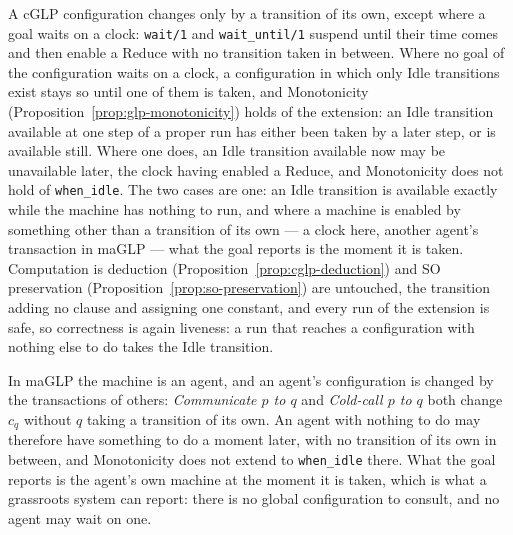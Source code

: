 A cGLP configuration changes only by a transition of its own, except where a goal waits on a clock: \verb|wait/1| and \verb|wait_until/1| suspend until their time comes and then enable a Reduce with no transition taken in between.  Where no goal of the configuration waits on a clock, a configuration in which only Idle transitions exist stays so until one of them is taken, and Monotonicity (Proposition~\ref{prop:glp-monotonicity}) holds of the extension: an Idle transition available at one step of a proper run has either been taken by a later step, or is available still.  Where one does, an Idle transition available now may be unavailable later, the clock having enabled a Reduce, and Monotonicity does not hold of \verb|when_idle|.  The two cases are one: an Idle transition is available exactly while the machine has nothing to run, and where a machine is enabled by something other than a transition of its own --- a clock here, another agent's transaction in maGLP --- what the goal reports is the moment it is taken.  Computation is deduction (Proposition~\ref{prop:cglp-deduction}) and SO preservation (Proposition~\ref{prop:so-preservation}) are untouched, the transition adding no clause and assigning one constant, and every run of the extension is safe, so correctness is again liveness: a run that reaches a configuration with nothing else to do takes the Idle transition.

In maGLP the machine is an agent, and an agent's configuration is changed by the transactions of others: \emph{Communicate $p$ to $q$} and \emph{Cold-call $p$ to $q$} both change $c_q$ without $q$ taking a transition of its own.  An agent with nothing to do may therefore have something to do a moment later, with no transition of its own in between, and Monotonicity does not extend to \verb|when_idle| there.  What the goal reports is the agent's own machine at the moment it is taken, which is what a grassroots system can report: there is no global configuration to consult, and no agent may wait on one.
